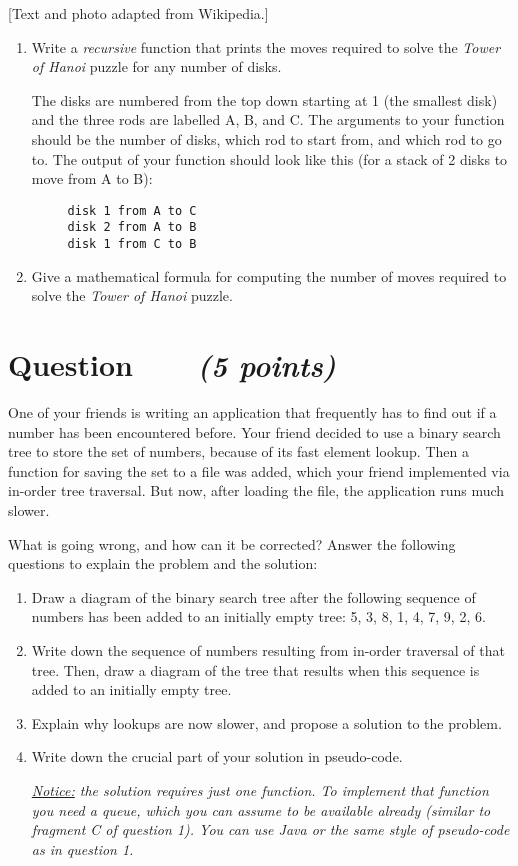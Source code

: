 \documentclass[a4paper]{article}
\newcounter{question}
\newcommand{\question}[1]{\refstepcounter{question}\section*{Question~\thequestion~~~\small\emph{(#1)}}}
\renewcommand*\thequestion{\arabic{question}}
\begin{document}
\footnotesize
\hfill
[Text and photo adapted from Wikipedia.]
\normalsize

\begin{enumerate}
\item
  Write a \emph{recursive} function that prints the moves required to solve the \emph{Tower of Hanoi} puzzle for any number of disks.
  
  The disks are numbered from the top down starting at 1 (the smallest disk) and the three rods are labelled A, B, and C.
  The arguments to your function should be the number of disks, which rod to start from, and which rod to go to.
  The output of your function should look like this (for a stack of 2 disks to move from A to B):
\begin{verbatim}
     disk 1 from A to C
     disk 2 from A to B
     disk 1 from C to B
\end{verbatim}

\item
  Give a mathematical formula for computing the number of moves required to solve the \emph{Tower of Hanoi} puzzle.
  
\end{enumerate}


\clearpage

\question{5 points}

One of your friends is writing an application that frequently has to find out if a number has been encountered before.
Your friend decided to use a binary search tree to store the set of numbers, because of its fast element lookup.
Then a function for saving the set to a file was added, which your friend implemented via in-order tree traversal.
But now, after loading the file, the application runs much slower.

What is going wrong, and how can it be corrected?
Answer the following questions to explain the problem and the solution:
\begin{enumerate}
\item
  Draw a diagram of the binary search tree after the following sequence of numbers has been added to an initially empty tree: 5, 3, 8, 1, 4, 7, 9, 2, 6.
\item
  Write down the sequence of numbers resulting from in-order traversal of that tree.
  Then, draw a diagram of the tree that results when this sequence is added to an initially empty tree.
\item
  Explain why lookups are now slower, and propose a solution to the problem.
\item
  Write down the crucial part of your solution in pseudo-code.
  
  \emph{\underline{Notice:} the solution requires just one function.
    To implement that function you need a queue, which you can assume to be available already (similar to fragment C of question 1).
    You can use Java or the same style of pseudo-code as in question 1.}
\end{enumerate}
\end{document}

